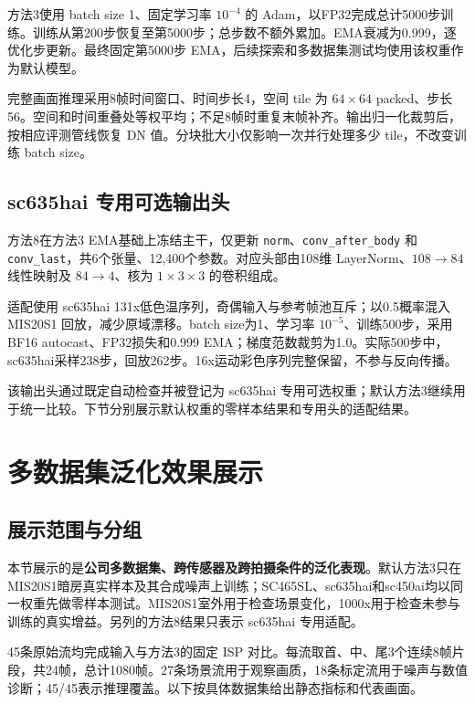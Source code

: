 \documentclass[11pt,a4paper,UTF8,fontset=fandol]{ctexart}
\begin{document}
方法3使用 batch size 1、固定学习率 $10^{-4}$ 的 Adam，以FP32完成总计5000步训练。训练从第200步恢复至第5000步；总步数不额外累加。EMA衰减为0.999，逐优化步更新。最终固定第5000步 EMA，后续探索和多数据集测试均使用该权重作为默认模型。

完整画面推理采用8帧时间窗口、时间步长4，空间 tile 为 $64\times64$ packed、步长56。空间和时间重叠处等权平均；不足8帧时重复末帧补齐。输出归一化裁剪后，按相应评测管线恢复 DN 值。分块批大小仅影响一次并行处理多少 tile，不改变训练 batch size。

\subsection{sc635hai 专用可选输出头}
\label{sec:head}

方法8在方法3 EMA基础上冻结主干，仅更新 \texttt{norm}、\texttt{conv\_after\_body} 和 \texttt{conv\_last}，共6个张量、12,400个参数。对应头部由108维 LayerNorm、$108\rightarrow84$线性映射及 $84\rightarrow4$、核为 $1\times3\times3$ 的卷积组成。

适配使用 sc635hai 131x低色温序列，奇偶输入与参考帧池互斥；以0.5概率混入 MIS20S1 回放，减少原域漂移。batch size为1、学习率 $10^{-5}$、训练500步，采用BF16 autocast、FP32损失和0.999 EMA；梯度范数裁剪为1.0。实际500步中，sc635hai采样238步，回放262步。16x运动彩色序列完整保留，不参与反向传播。

该输出头通过既定自动检查并被登记为 sc635hai 专用可选权重；默认方法3继续用于统一比较。下节分别展示默认权重的零样本结果和专用头的适配结果。

\section{多数据集泛化效果展示}
\label{sec:results}

\subsection{展示范围与分组}

本节展示的是\textbf{公司多数据集、跨传感器及跨拍摄条件的泛化表现}。默认方法3只在 MIS20S1暗房真实样本及其合成噪声上训练；SC465SL、sc635hai和sc450ai均以同一权重先做零样本测试。MIS20S1室外用于检查场景变化，1000x用于检查未参与训练的真实增益。另列的方法8结果只表示 sc635hai 专用适配。

45条原始流均完成输入与方法3的固定 ISP 对比。每流取首、中、尾3个连续8帧片段，共24帧，总计1080帧。27条场景流用于观察画质，18条标定流用于噪声与数值诊断；45/45表示推理覆盖。以下按具体数据集给出静态指标和代表画面。
\end{document}
